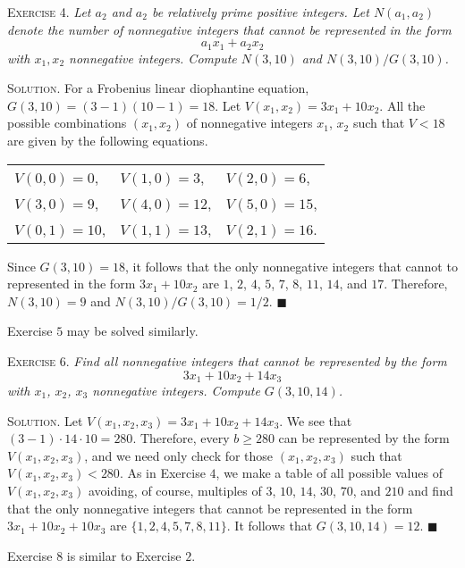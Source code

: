 \documentclass[11pt, leqno]{article}
\newcommand{\done}{\ensuremath{\blacksquare}}
\begin{document}
\textsc{Exercise 4}. \emph{Let $a_2$ and $a_2$ be relatively prime positive integers. Let $N(a_1, a_2)$ denote the number of nonnegative integers that cannot be represented in the form 
\begin{displaymath}
a_1x_1 + a_2x_2
\end{displaymath}
with $x_1, x_2$ nonnegative integers. Compute $N(3,10)$ and $N(3,10)/G(3,10)$.}

\textsc{Solution}. For a Frobenius linear diophantine equation, $G(3,10) = (3-1)(10-1) = 18$. Let $V(x_1, x_2) = 3x_1 + 10x_2$. All the possible combinations $(x_1, x_2)$ of nonnegative integers $x_1$, $x_2$ such that $V<18$ are given by the following equations.
\begin{longtable}{p{6em} p{6em} p{6em}}
  $V(0, 0) = 0$, & $V(1,0) = 3$, & $V(2,0) = 6$, \\
  $V(3, 0) = 9$, & $V(4, 0) = 12$, & $V(5, 0) = 15$, \\
  $V(0, 1) = 10$, & $V(1, 1) = 13$, & $V(2, 1) = 16$.
\end{longtable}
\reduce

Since $G(3,10)=18$, it follows that the only nonnegative integers that cannot to represented in the form $3x_1 + 10x_2$ are $1$, $2$, $4$, $5$, $7$, $8$, $11$, $14$, and $17$. Therefore, $N(3,10) = 9$ and $N(3,10)/G(3,10) = 1/2$. \done

Exercise $5$ may be solved similarly.

\textsc{Exercise 6}. \emph{Find all nonnegative integers that cannot be represented by the form 
\begin{displaymath}
3x_1 + 10x_2 + 14x_3
\end{displaymath}
with $x_1$, $x_2$, $x_3$ nonnegative integers. Compute $G(3,10,14)$.}

\textsc{Solution}. Let $V(x_1, x_2, x_3) = 3x_1 + 10x_2 + 14x_3$. We see that $(3-1)\cdot 14 \cdot 10 = 280$. Therefore, every $b\geq 280$ can be represented by the form $V(x_1, x_2, x_3)$, and we need only check for those $(x_1, x_2, x_3)$ such that $V(x_1, x_2, x_3) < 280$. As in Exercise $4$, we make a table of all possible values of $V(x_1, x_2, x_3)$ avoiding, of course, multiples of $3$, $10$, $14$, $30$, $70$, and $210$ and find that the only nonnegative integers that cannot be represented in the form $3x_1 + 10x_2 + 10x_3$ are $\{ 1, 2, 4, 5, 7, 8, 11 \}$. It follows that $G(3,10,14) = 12$. \done

Exercise $8$ is similar to Exercise $2$.
\end{document}
